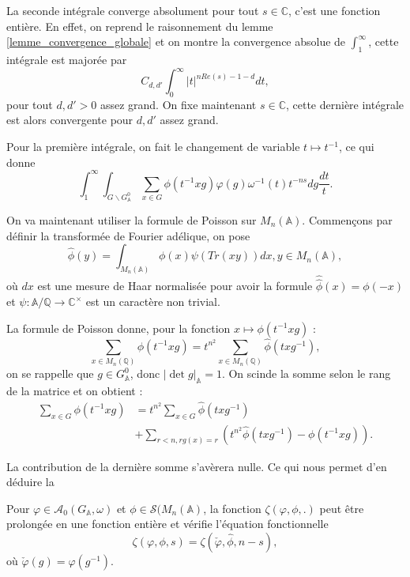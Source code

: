 La seconde intégrale converge absolument pour tout $s \in \mathbb{C}$, c'est une fonction entière. En effet, on reprend le raisonnement du lemme \ref{lemme_convergence_globale} et on montre la convergence absolue de $\int_1^\infty$, cette intégrale est majorée par
\begin{equation}
C_{d,d'} \int_0^\infty |t|^{nRe(s)-1-d} dt,
\end{equation}
pour tout $d, d' > 0$ assez grand. On fixe maintenant $s \in \mathbb{C}$, cette dernière intégrale est alors convergente pour $d, d'$ assez grand.

Pour la première intégrale, on fait le changement de variable $t \mapsto t^{-1}$, ce qui donne
\begin{equation}
\int_1^\infty \int_{G \backslash G^0_\mathbb{A}} \sum_{x \in G}{\phi(t^{-1}xg)} \varphi(g) \omega^{-1}(t) t^{-ns} dg \frac{dt}{t}.
\end{equation}

On va maintenant utiliser la formule de Poisson sur $M_n(\mathbb{A})$. Commençons par définir la transformée de Fourier adélique, on pose
\begin{equation}
\hat{\phi}(y) = \int_{M_n(\mathbb{A})} \phi(x)\psi(Tr(xy))dx, y \in M_n(\mathbb{A}),
\end{equation}
où $dx$ est une mesure de Haar normalisée pour avoir la formule $\hat{\hat{\phi}}(x)=\phi(-x)$ et $\psi : \mathbb{A}/\mathbb{Q} \rightarrow \mathbb{C}^\times$ est un caractère non trivial.

La formule de Poisson donne, pour la fonction $x \mapsto \phi(t^{-1}xg)$ :
\begin{equation}
\sum_{x \in M_n(\mathbb{Q})} \phi(t^{-1}xg) = t^{n^2}\sum_{x \in M_n(\mathbb{Q})} \hat{\phi}(txg^{-1}),
\end{equation}
on se rappelle que $g \in G^0_\mathbb{A}$, donc $|\det g|_\mathbb{A}=1$. On scinde la somme selon le rang de la matrice et on obtient :
\begin{equation}
\begin{split}
\sum_{x \in G} \phi(t^{-1}xg) &= t^{n^2}\sum_{x \in G} \hat{\phi}(txg^{-1}) \\
&+ \sum_{r < n, rg(x)=r} \left( t^{n^2}\hat{\phi}(txg^{-1}) - \phi(t^{-1}xg)\right).
\end{split}
\end{equation}

La contribution de la dernière somme s'avèrera nulle. Ce qui nous permet d'en déduire la
\begin{proposition}
Pour $\varphi \in \mathcal{A}_0(G_\mathbb{A}, \omega)$ et $\phi \in \mathcal{S}(M_n(\mathbb{A})$, la fonction $\zeta(\varphi, \phi, .)$ peut être prolongée en une fonction entière et vérifie l'équation fonctionnelle
\begin{equation}
\label{eqcusp}
\zeta(\varphi, \phi, s) = \zeta(\check{\varphi}, \hat{\phi}, n-s),
\end{equation}
où $\check{\varphi}(g)=\varphi(g^{-1})$.
\end{proposition}


